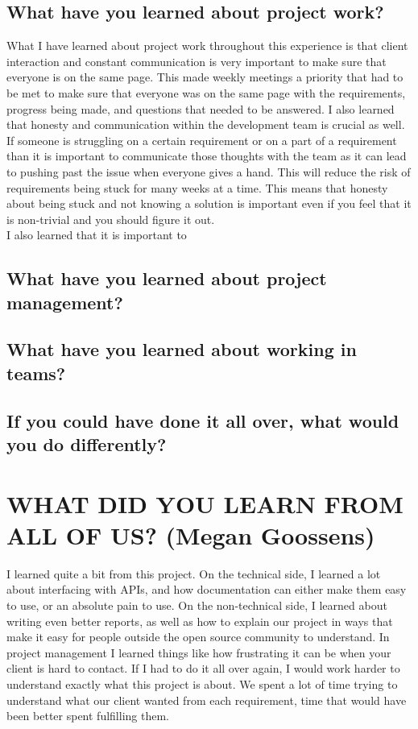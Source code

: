 \documentclass[draftclsnofoot,10pt,onecolumn]{IEEEtran} %
\begin{document}
\subsection{What have you learned about project work?}

What I have learned about project work throughout this experience is that client interaction and constant communication is
very important to make sure that everyone is on the same page. This made weekly meetings a priority that had to be met to 
make sure that everyone was on the same page with the requirements, progress being made, and questions that needed to be
answered. I also learned that honesty and communication within the development team is crucial as well. If someone is struggling
on a certain requirement or on a part of a requirement than it is important to communicate those thoughts with the team as 
it can lead to pushing past the issue when everyone gives a hand. This will reduce the risk of requirements being stuck for
many weeks at a time. This means that honesty about being stuck and not knowing a solution is important even if you feel that
it is non-trivial and you should figure it out. \\

I also learned that it is important to \\

\subsection{What have you learned about project management?}

\subsection{What have you learned about working in teams?}

\subsection{If you could have done it all over, what would you do differently?}


\section{WHAT DID YOU LEARN FROM ALL OF US? (Megan Goossens)}
I learned quite a bit from this project. On the technical side, I learned a lot
about interfacing with APIs, and how documentation can either make them easy to
use, or an absolute pain to use. On the non-technical side, I learned about
writing even better reports, as well as how to explain our project in ways that
make it easy for people outside the open source community to understand.  In
project management I learned things like how frustrating it can be when your
client is hard to contact. If I had to do it all over again, I would work harder
to understand exactly what this project is about. We spent a lot of time trying
to understand what our client wanted from each requirement, time that would have
been better spent fulfilling them.
\end{document}
